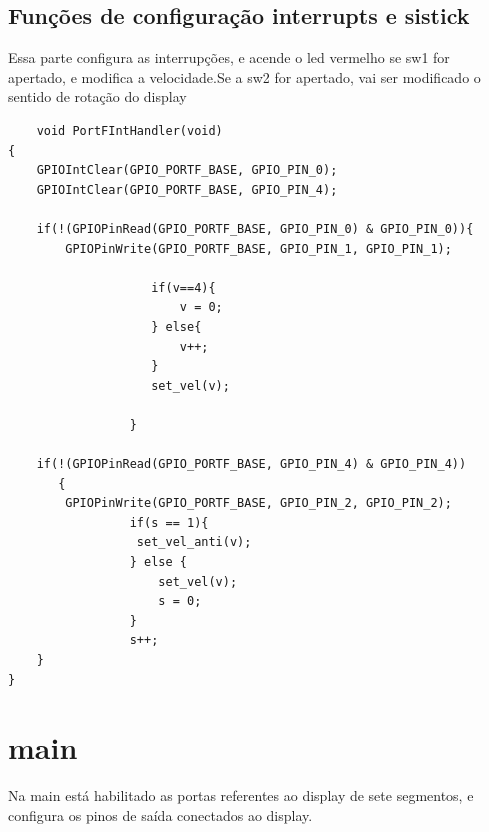 \documentclass{article}
\begin{document}
\subsection{Funções de  configuração interrupts e sistick}
Essa parte configura as interrupções, e acende o led vermelho se sw1 for apertado, e modifica a velocidade.Se a sw2  for apertado,
vai ser modificado o sentido de rotação do display 
\begin{lstlisting}
    void PortFIntHandler(void)
{
    GPIOIntClear(GPIO_PORTF_BASE, GPIO_PIN_0);
    GPIOIntClear(GPIO_PORTF_BASE, GPIO_PIN_4);

    if(!(GPIOPinRead(GPIO_PORTF_BASE, GPIO_PIN_0) & GPIO_PIN_0)){
        GPIOPinWrite(GPIO_PORTF_BASE, GPIO_PIN_1, GPIO_PIN_1);

                    if(v==4){
                        v = 0;
                    } else{
                        v++;
                    }
                    set_vel(v);

                 }

    if(!(GPIOPinRead(GPIO_PORTF_BASE, GPIO_PIN_4) & GPIO_PIN_4))
       {
        GPIOPinWrite(GPIO_PORTF_BASE, GPIO_PIN_2, GPIO_PIN_2);
                 if(s == 1){
                  set_vel_anti(v);
                 } else {
                     set_vel(v);
                     s = 0;
                 }
                 s++;
    }
}

\end{lstlisting}

\section{main}
Na main está habilitado as portas referentes ao display de sete segmentos, e configura os pinos de saída conectados ao display.
\end{document}
